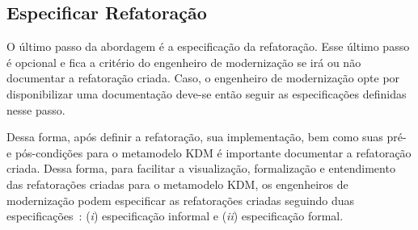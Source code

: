 



\subsection{Especificar Refatoração}\label{sec:template_refatoracao}

O último passo da abordagem é a especificação da refatoração. Esse último passo é opcional e fica a critério do engenheiro de modernização se irá ou não documentar a refatoração criada. Caso, o engenheiro de modernização opte por disponibilizar uma documentação deve-se então seguir as especificações definidas nesse passo.

Dessa forma, após definir a refatoração, sua implementação, bem como suas pré- e pós-condições para o metamodelo KDM é importante documentar a refatoração criada. Dessa forma, para facilitar a visualização, formalização e entendimento das refatorações criadas para o metamodelo KDM, os engenheiros de modernização podem especificar as refatorações criadas seguindo duas especificações~\cite{staron2004implementing}: (\textit{i}) especificação informal e (\textit{ii}) especificação formal. 

